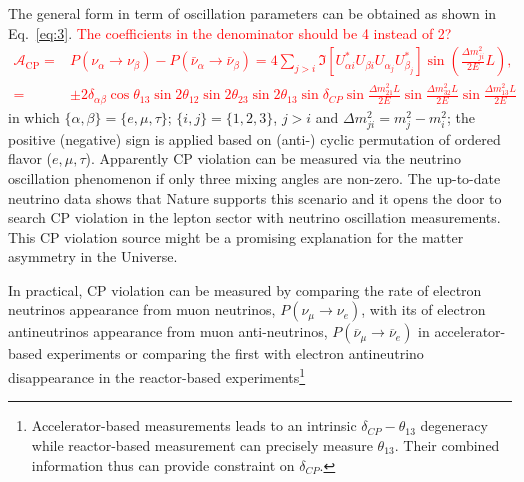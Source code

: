\documentclass[a4 paper,12pt]{report}%
\begin{document}
The general form in term of oscillation parameters can be obtained as shown in Eq.~\ref{eq:3}. \textcolor{red}{The coefficients in the denominator should be 4 instead of 2?
\noindent 
   \begin{align}\label{eq:3}
\mathcal{A}_{\text{CP}}=&P(\nu_\alpha \rightarrow \nu_\beta)-P(\bar\nu_\alpha \rightarrow \bar\nu_\beta) 
= 4\sum_{j>i}\Im\left[U^*_{\alpha i}U_{\beta i}U_{\alpha_j}U^*_{\beta_j}\right]\sin\left(\frac{\Delta m^2_{ji}}{2E}L\right), \nonumber \\
=&\pm 2 \delta_{\alpha \beta} \cos \theta_{13} \sin 2\theta_{12} \sin 2\theta_{23} \sin 2\theta_{13} \sin \delta_{CP} \sin \frac{\Delta m^2_{21}L}{2E}  \sin \frac{\Delta m^2_{32} L}{2E}  \sin \frac{\Delta m^2_{13} L }{2E}
   \end{align}}
in which $\{\alpha, \beta\} = \{e, \mu, \tau\}$; $\{i, j\} = \{1, 2, 3\}$, $j > i$ and $\Delta m^2_{ji} = m^2_j - m^2_i$; the positive (negative) sign is applied based on (anti-) cyclic permutation of ordered flavor ($e,\mu,\tau$). Apparently CP violation can be measured via the neutrino oscillation phenomenon if only three mixing angles are non-zero. The up-to-date neutrino data shows that Nature supports this scenario and it opens the door to search CP violation in the lepton sector with neutrino oscillation measurements. This CP violation source might be a promising explanation for the matter asymmetry in the Universe. \par


In practical, CP violation can be measured by comparing the rate of electron neutrinos appearance from muon neutrinos, $P(\nu_\mu \rightarrow \nu_e)$, with its of electron antineutrinos appearance from muon anti-neutrinos, $P(\overline{\nu}_\mu \rightarrow \overline{\nu}_e)$ in accelerator-based experiments or comparing the first with electron antineutrino disappearance in the reactor-based experiments\footnote{Accelerator-based measurements leads to an intrinsic $\delta_{CP}-\theta_{13}$ degeneracy while reactor-based measurement can precisely measure $\theta_{13}$. Their combined information thus can provide constraint on $\delta_{CP}$.}
\end{document}
